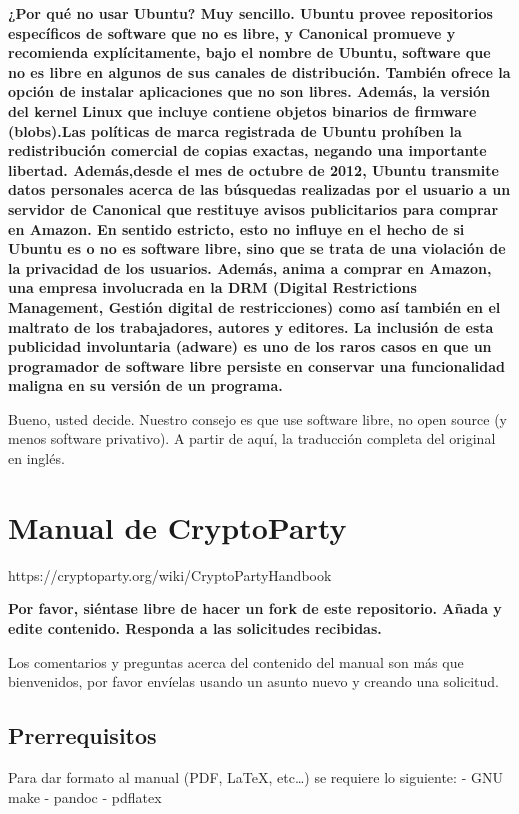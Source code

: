 \documentclass[10pt,a5paper,twoside,,]{book}
\begin{document}
\textbf{¿Por qué no usar Ubuntu? Muy sencillo. Ubuntu provee
repositorios específicos de software que no es libre, y Canonical
promueve y recomienda explícitamente, bajo el nombre de Ubuntu, software
que no es libre en algunos de sus canales de distribución. También
ofrece la opción de instalar aplicaciones que no son libres. Además, la
versión del kernel Linux que incluye contiene objetos binarios de
firmware (blobs).Las políticas de marca registrada de Ubuntu prohíben la
redistribución comercial de copias exactas, negando una importante
libertad. Además,desde el mes de octubre de 2012, Ubuntu transmite datos
personales acerca de las búsquedas realizadas por el usuario a un
servidor de Canonical que restituye avisos publicitarios para comprar en
Amazon. En sentido estricto, esto no influye en el hecho de si Ubuntu es
o no es software libre, sino que se trata de una violación de la
privacidad de los usuarios. Además, anima a comprar en Amazon, una
empresa involucrada en la DRM (Digital Restrictions Management, Gestión
digital de restricciones) como así también en el maltrato de los
trabajadores, autores y editores. La inclusión de esta publicidad
involuntaria (adware) es uno de los raros casos en que un programador de
software libre persiste en conservar una funcionalidad maligna en su
versión de un programa.}

Bueno, usted decide. Nuestro consejo es que use software libre, no open
source (y menos software privativo). A partir de aquí, la traducción
completa del original en inglés.

\chapter{Manual de CryptoParty}\label{manual-de-cryptoparty}

https://cryptoparty.org/wiki/CryptoPartyHandbook

\textbf{Por favor, siéntase libre de hacer un fork de este repositorio.
Añada y edite contenido. Responda a las solicitudes recibidas.}

Los comentarios y preguntas acerca del contenido del manual son más que
bienvenidos, por favor envíelas usando un asunto nuevo y creando una
solicitud.

\section{Prerrequisitos}\label{prerrequisitos}

Para dar formato al manual (PDF, LaTeX, etc\ldots{}) se requiere lo
siguiente: - GNU make - pandoc - pdflatex
\end{document}
